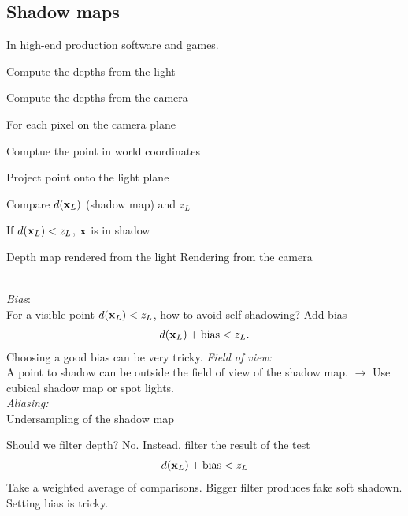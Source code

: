\begin{compactdesc}
\section{Shadow maps}
In high-end production software and games. \\
\begin{enumerate*}[label=\protect\circled{\arabic*},itemjoin=]
	\item Compute the depths from the light\\
	\item Compute the depths from the camera
\end{enumerate*}
\item[\lp{Algorithm}]
For each pixel on the camera plane\\
\begin{enumerate*}[label=\protect\circled{\arabic*},itemjoin=]
	\item Comptue the point in world coordinates\\
	\item Project point onto the light plane\\
	\item Compare $d(\bm{\mathrm{x}}_L)$ (shadow map) and $z_L$\\
	\item If $d(\bm{\mathrm{x}}_L)<z_L$, $\bm{\mathrm{x}}$ is in shadow
\end{enumerate*}
Depth map rendered from the light
Rendering from the camera
	\item[\lp{Limitations}]\hfill \\
		\emph{Bias}:\\
		For a visible point $d(\bm{\mathrm{x}}_L)<z_L$, how to avoid self-shadowing? Add bias
		\begin{gather*}
			d(\bm{\mathrm{x}}_L)+\text{bias}<z_L.
		\end{gather*}
		Choosing a good bias can be very tricky.
		\emph{Field of view:} \\A point to shadow can be outside the field of view of the shadow map. $\to$ Use cubical shadow map or spot lights.\\
		\emph{Aliasing:}\\
		Undersampling of the shadow map
	\item[\lp{Filtering}] Should we filter depth? No. Instead, filter the result of the test
		\begin{gather*}
			d(\bm{\mathrm{x}}_L)+\text{bias}<z_L
		\end{gather*}
		Take a weighted average of comparisons. Bigger filter produces fake soft shadown. Setting bias is tricky.

\end{compactdesc}
